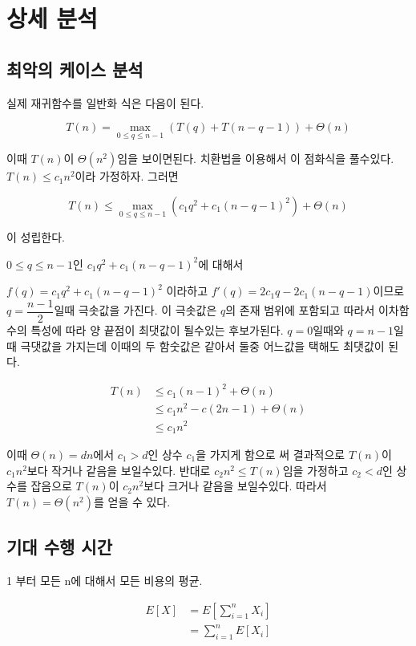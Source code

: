 
\section{상세 분석}

\subsection{최악의 케이스 분석 }


실제 재귀함수를 일반화 식은 다음이 된다.

$$T(n) = \max_{0 \le q \le n-1}(T(q) + T(n-q-1)) + \Theta(n)$$

이때 $T(n)$이 $\Theta(n^2)$임을 보이면된다.
치환법을 이용해서 이 점화식을 풀수있다.
$T(n) \le c_1n^2$이라 가정하자. 그러면

$$T(n) \le \max_{0 \le q \le n-1}(c_1q^2 + c_1(n-q-1)^2) + \Theta(n)$$

이 성립한다. 

$0 \le q \le n-1$인 $c_1q^2 + c_1(n-q-1)^2$에 대해서 

$f(q) = c_1q^2 + c_1(n-q-1)^2$ 이라하고 $f'(q) = 2c_1q - 2c_1(n-q-1)$이므로 $q=\dfrac{n-1}{2}$일때 극솟값을 가진다. 이 극솟값은 $q$의 존재 범위에 포함되고 따라서 이차함수의 특성에 따라 양 끝점이 최댓값이 될수있는 후보가된다. $q=0$일때와 $q=n-1$일때 극댓값을 가지는데 이때의 두 함숫값은 같아서 둘중 어느값을 택해도 최댓값이 된다.

\begin{align*}
    T(n) & \le c_1(n-1)^2 + \Theta(n) \\
    & \le c_1n^2 - c(2n-1) + \Theta(n) \\
    & \le c_1n^2    
\end{align*}


이때 $\Theta(n) = dn$에서 $ c_1 > d $인 상수 $c_1$을 가지게 함으로 써 결과적으로 $T(n)$이 $c_1n^2$보다 작거나 같음을 보일수있다. 반대로 $c_2n^2 \le T(n)$임을 가정하고  $ c_2 < d $인 상수를 잡음으로 $T(n)$이 $c_2n^2$보다 크거나 같음을 보일수있다. 따라서 $T(n) = \Theta(n^2)$를 얻을 수 있다.


\subsection{기대 수행 시간}

1 부터 모든 n에 대해서 모든 비용의 평균.


\begin{align*}
    E[X] &= E\left[ \sum_{i=1}^{n}X_i \right] \\
    &= \sum_{i=1}^{n}E\left[X_i \right]   
\end{align*}
 
